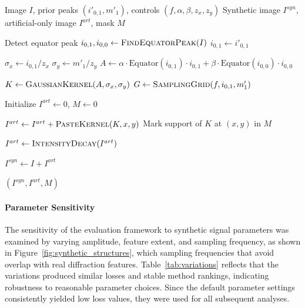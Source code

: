\documentclass[iucr]{iucrjournals}
\begin{document}
\begin{algorithm}[htbp]
\centering
\begin{minipage}{0.96\columnwidth}
\begin{algorithmic}[1]

\Require Image $I$, prior peaks $(i'_{0,1}, m'_1)$, controls $(f, \alpha, \beta, z_x, z_y)$
\Ensure Synthetic image $I^{syn}$, artificial-only image $I^{art}$, mask $M$

\State Detect equator peak $i_{0,1}, i_{0,0} \leftarrow \textsc{FindEquatorPeak}(I)$
    \State $i_{0,1} \leftarrow i'_{0,1}$
\EndIf

\State $\sigma_x \leftarrow i_{0,1} / z_x$
\State $\sigma_y \leftarrow m'_1 / z_y$
\State $A \leftarrow \alpha \cdot \text{Equator}(i_{0,1}) \cdot i_{0,1} + \beta \cdot \text{Equator}(i_{0,0}) \cdot i_{0,0}$

\State $K \leftarrow \textsc{GaussianKernel}(A, \sigma_x, \sigma_y)$
\State $G \leftarrow \textsc{SamplingGrid}(f, i_{0,1}, m'_1)$

\State Initialize $I^{art} \leftarrow 0$, $M \leftarrow 0$

    \State $I^{art} \leftarrow I^{art} + \textsc{PasteKernel}(K, x, y)$
    \State Mark support of $K$ at $(x,y)$ in $M$
\EndFor

\State $I^{art} \gets \textsc{IntensityDecay}(I^{art})$

\State $I^{syn} \leftarrow I + I^{art}$

\State \Return $(I^{syn}, I^{art}, M)$

\end{algorithmic}
\end{minipage}
\caption{Procedure for synthetic-feature generation and mask construction used for validation in the absence of ground-truth background.}
\label{alg:synthetic_signal}
\end{algorithm}


\paragraph{Parameter Sensitivity}
The sensitivity of the evaluation framework to synthetic signal parameters was examined by varying amplitude, feature extent, and sampling frequency, as shown in Figure~\ref{fig:synthetic_structures}, which sampling frequencies that avoid overlap with real diffraction features. Table~\ref{tab:variations} reflects that the variations produced similar losses and stable method rankings, indicating robustness to reasonable parameter choices. Since the default parameter settings consistently yielded low loss values, they were used for all subsequent analyses.
\end{document}
